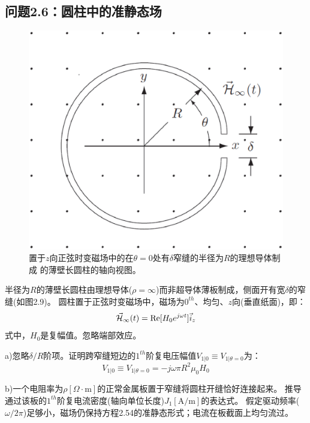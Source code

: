 \subsection{问题2.6：圆柱中的准静态场}

\begin{figure}[htbp]
  \centering
 \includegraphics[scale=0.4]{chpt2/figs/fig2.9.eps}
  \caption{置于$z$向正弦时变磁场中的在$\theta=0$处有$\delta$窄缝的半径为$R$的理想导体制成
  的薄壁长圆柱的轴向视图。}
\end{figure}

半径为$R$的薄壁长圆柱由理想导体($\rho=\infty$)而非超导体薄板制成，侧面开有宽$\delta$的窄缝(如图2.9)。
圆柱置于正弦时变磁场中，磁场为$0^{th}$、均匀、$z$向(垂直纸面)，即：
\begin{equation}
\vec{\CMcal{H}}_\infty(t)=\mathrm{Re}[H_0 e^{j\omega t}] \vec{i}_z
\end{equation}
式中，$H_0$是复幅值。忽略端部效应。

a)忽略$\delta/R$阶项。证明跨窄缝短边的$1^{th}$阶复电压幅值$V_{1|0}\equiv V_{1|\theta=0}$为：
\begin{equation}
V_{1|0}\equiv V_{1|\theta=0}=-j\omega \pi R^2 \mu_0 H_0
\end{equation}

b)一个电阻率为$\rho[\Omega\cdot\mathrm{m}]$的正常金属板置于窄缝将圆柱开缝恰好连接起来。
推导通过该板的$1^{th}$阶复电流密度(轴向单位长度)$J_1 [\mathrm{A/m}]$的表达式。
假定驱动频率($\omega/2\pi$)足够小，磁场仍保持方程2.54的准静态形式；电流在板截面上均匀流过。

